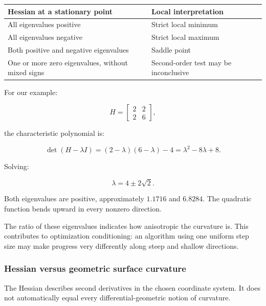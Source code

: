{\def\LTcaptype{none} %
\begin{longtable}[]{@{}
  >{\raggedright\arraybackslash}p{}
  >{\raggedright\arraybackslash}p{}@{}}
\toprule\noalign{}
\begin{minipage}[b]{\linewidth}\raggedright
Hessian at a stationary point
\end{minipage} & \begin{minipage}[b]{\linewidth}\raggedright
Local interpretation
\end{minipage} \\
\midrule\noalign{}
\endhead
\bottomrule\noalign{}
\endlastfoot
All eigenvalues positive & Strict local minimum \\
All eigenvalues negative & Strict local maximum \\
Both positive and negative eigenvalues & Saddle point \\
One or more zero eigenvalues, without mixed signs & Second-order test may be inconclusive \\
\end{longtable}
}

For our example:

\[
H= \begin{bmatrix}2&2\\2&6\end{bmatrix},
\]

the characteristic polynomial is:

\[
\det(H-\lambda I) =(2-\lambda)(6-\lambda)-4 =\lambda^2-8\lambda+8.
\]

Solving:

\[
\lambda=4\pm2\sqrt2.
\]

Both eigenvalues are positive, approximately \(1.1716\) and \(6.8284\). The quadratic function bends upward in every nonzero direction.

The ratio of these eigenvalues indicates how anisotropic the curvature is. This contributes to optimization conditioning: an algorithm using one uniform step size may make progress very differently along steep and shallow directions.

\subsubsection{Hessian versus geometric surface curvature}\label{02-foundations-ii-ch021-hessian-versus-geometric-surface-curvature}

The Hessian describes second derivatives in the chosen coordinate system. It does not automatically equal every differential-geometric notion of curvature.

